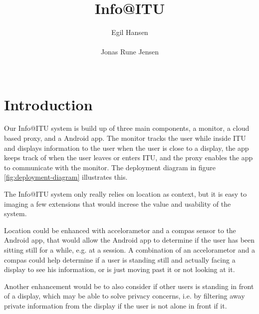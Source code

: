 \documentclass{ubicomp2011}
\begin{document}
\setlength{\paperheight}{11in}
\setlength{\paperwidth}{8.5in}
\setlength{\pdfpageheight}{\paperheight}
\setlength{\pdfpagewidth}{\paperwidth}

\toappear{}



\title{Info@ITU}
\author{
  \alignauthor Egil Hansen\\
    \\
 \alignauthor Jonas Rune Jensen\\
    \\
    }

\maketitle

\section{Introduction}

Our Info@ITU system is build up of three main components, a monitor, a cloud based proxy, and a Android app. The monitor tracks the user while inside ITU and displays information to the user when the user is close to a display, the app keeps track of when the user leaves or enters ITU, and the proxy enables the app to communicate with the monitor. The deployment diagram in figure \ref{fig:deployment-diagram} illustrates this.

The Info@ITU system only really relies on location as context, but it is easy to imaging a few extensions that would increse the value and usability of the system.

Location could be enhanced with accelorametor and a compas sensor to the Android app, that would allow the Android app to determine if the user has been sitting still for a while,
e.g. at a session. A combination of an accelorametor and a compas could help determine if a user is standing still and actually facing a display to see his information, or is just moving past it or not looking at it.

Another enhancement would be to also consider if other users is standing in front of a display, which may be able to solve privacy concerns, i.e. by filtering away private information from the display if the user is not alone in front if it.
\end{document}
